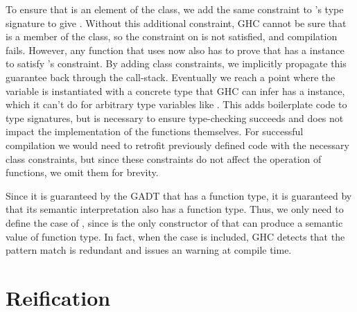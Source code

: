 To ensure that  is an element of the  class, we add the same constraint to 's type signature to give . 
Without this additional constraint, GHC cannot be sure that  is a member of the  class, so the constraint on  is not satisfied, and compilation fails. However, any function that uses  now also has to prove that  has a  instance to satisfy 's constraint. By adding class constraints, we implicitly propagate this guarantee back through the call-stack. Eventually we reach a point where the  variable is instantiated with a concrete type that GHC can infer has a  instance, which it can't do for arbitrary type variables like . This adds boilerplate code to type signatures, but is necessary to ensure type-checking succeeds and does not impact the implementation of the functions themselves. For successful compilation we would need to retrofit previously defined code with the necessary class constraints, but since these constraints do not affect the operation of functions, we omit them for brevity.


Since it is guaranteed by the  GADT that  has a function type, it is guaranteed by  that its semantic interpretation  also has a function type. Thus, we only need to define the  case of , since  is the only constructor of  that can produce a semantic value of function type. In fact, when the  case is included, GHC detects that the pattern match is redundant and issues an  warning at compile time. 


\section{Reification}


